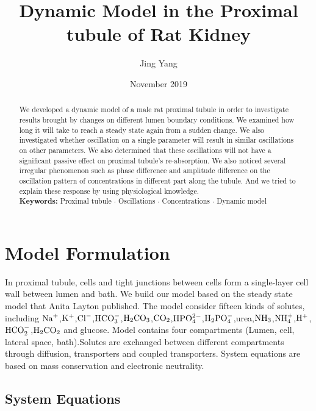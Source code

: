 \documentclass{article}
\title{Dynamic Model in the Proximal tubule of Rat Kidney}
\author{Jing Yang}
\date{November 2019}
\begin{document}
\maketitle

\begin{abstract}
We developed a dynamic model of a male rat proximal tubule in order to investigate results brought by changes on different lumen boundary conditions. We examined how long it will take to reach a steady state again from a sudden change. We also investigated whether oscillation on a single parameter will result in similar oscillations on other parameters. We also determined that these oscillations will not have a significant passive effect on proximal tubule's re-absorption. We also noticed several irregular phenomenon such as phase difference and amplitude difference on the oscillation pattern of concentrations in different part along the tubule. And we tried to explain these response by using physiological knowledge.\\

\noindent \textbf{Keywords: }Proximal tubule $\cdot$ Oscillations $\cdot$ Concentrations $\cdot$ Dynamic model
\end{abstract}


\section{Model Formulation}
In proximal tubule, cells and tight junctions between cells form a single-layer cell wall between lumen and bath. We build our model based on the steady state model that Anita Layton published. The model consider fifteen kinds of solutes, including $\rm {Na}^{+}$,$\rm {K}^{+}$,$\rm {Cl}^{-}$,$\rm {HCO}_{3}^{-}$,$\rm H_{2}CO_{3}$,$\rm CO_{2}$,$\rm HPO_{4}^{2-}$,$\rm H_{2}PO_{4}^{-}$,urea,$\rm NH_{3}$,$\rm NH_{4}^{+}$,$\rm H^{+}$,\\$\rm HCO_{2}^{-}$,$\rm H_{2}CO_2$ and glucose. Model contains four compartments (Lumen, cell, lateral space, bath).Solutes are exchanged between different compartments through diffusion, transporters and coupled transporters. System equations are based on mass conservation and electronic neutrality. 

\subsection{System Equations}
\end{document}
